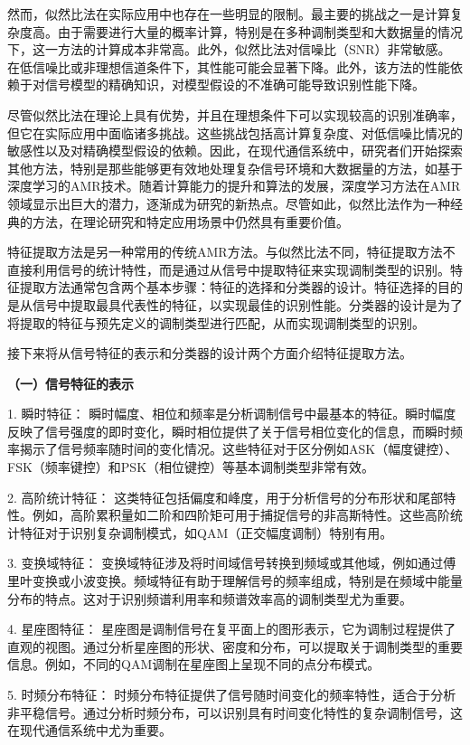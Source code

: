 然而，似然比法在实际应用中也存在一些明显的限制。最主要的挑战之一是计算复杂度高。由于需要进行大量的概率计算，特别是在多种调制类型和大数据量的情况下，这一方法的计算成本非常高。此外，似然比法对信噪比（SNR）非常敏感。在低信噪比或非理想信道条件下，其性能可能会显著下降。此外，该方法的性能依赖于对信号模型的精确知识，对模型假设的不准确可能导致识别性能下降。

尽管似然比法在理论上具有优势，并且在理想条件下可以实现较高的识别准确率，但它在实际应用中面临诸多挑战。这些挑战包括高计算复杂度、对低信噪比情况的敏感性以及对精确模型假设的依赖。因此，在现代通信系统中，研究者们开始探索其他方法，特别是那些能够更有效地处理复杂信号环境和大数据量的方法，如基于深度学习的AMR技术。随着计算能力的提升和算法的发展，深度学习方法在AMR领域显示出巨大的潜力，逐渐成为研究的新热点。尽管如此，似然比法作为一种经典的方法，在理论研究和特定应用场景中仍然具有重要价值。

特征提取方法是另一种常用的传统AMR方法。与似然比法不同，特征提取方法不直接利用信号的统计特性，而是通过从信号中提取特征来实现调制类型的识别。特征提取方法通常包含两个基本步骤：特征的选择和分类器的设计。特征选择的目的是从信号中提取最具代表性的特征，以实现最佳的识别性能。分类器的设计是为了将提取的特征与预先定义的调制类型进行匹配，从而实现调制类型的识别。

接下来将从信号特征的表示和分类器的设计两个方面介绍特征提取方法。

\textbf{（一）信号特征的表示}

1. 瞬时特征：
   瞬时幅度、相位和频率是分析调制信号中最基本的特征。瞬时幅度反映了信号强度的即时变化，瞬时相位提供了关于信号相位变化的信息，而瞬时频率揭示了信号频率随时间的变化情况。这些特征对于区分例如ASK（幅度键控）、FSK（频率键控）和PSK（相位键控）等基本调制类型非常有效。

2. 高阶统计特征：
   这类特征包括偏度和峰度，用于分析信号的分布形状和尾部特性。例如，高阶累积量如二阶和四阶矩可用于捕捉信号的非高斯特性。这些高阶统计特征对于识别复杂调制模式，如QAM（正交幅度调制）特别有用。

3. 变换域特征：
   变换域特征涉及将时间域信号转换到频域或其他域，例如通过傅里叶变换或小波变换。频域特征有助于理解信号的频率组成，特别是在频域中能量分布的特点。这对于识别频谱利用率和频谱效率高的调制类型尤为重要。

4. 星座图特征：
   星座图是调制信号在复平面上的图形表示，它为调制过程提供了直观的视图。通过分析星座图的形状、密度和分布，可以提取关于调制类型的重要信息。例如，不同的QAM调制在星座图上呈现不同的点分布模式。

5. 时频分布特征：
   时频分布特征提供了信号随时间变化的频率特性，适合于分析非平稳信号。通过分析时频分布，可以识别具有时间变化特性的复杂调制信号，这在现代通信系统中尤为重要。

